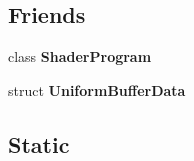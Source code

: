 \subsection*{Friends}
\begin{DoxyCompactItemize}
\item 
\mbox{\label{classrev_1_1_u_b_o_aef20119bde6aff11ffd23f3ea2131b86}} 
class {\bfseries Shader\+Program}
\item 
\mbox{\label{classrev_1_1_u_b_o_ad822365c23ec45fc98317c00b733bb02}} 
struct {\bfseries Uniform\+Buffer\+Data}
\end{DoxyCompactItemize}
\subsection*{Static}
